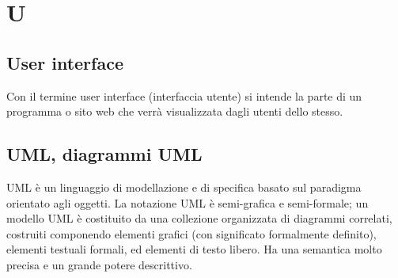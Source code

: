 \section{U}
	\subsection{User interface} 
		Con il termine user interface (interfaccia utente) si intende la parte di un programma o sito web che verrà visualizzata dagli utenti dello stesso.

	\subsection{UML, diagrammi UML} 
		UML è un linguaggio di modellazione e di specifica basato sul paradigma orientato agli oggetti. La notazione UML è semi-grafica e semi-formale; un modello UML è costituito da una collezione organizzata di diagrammi correlati, costruiti componendo elementi grafici (con significato formalmente definito), elementi testuali formali, ed elementi di testo libero. Ha una semantica molto precisa e un grande potere descrittivo. 
	
\newpage